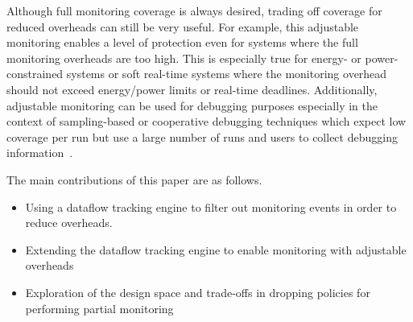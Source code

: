 Although full monitoring coverage is always desired, trading off coverage for
reduced overheads can still be very useful. For example, this adjustable
monitoring enables a level of protection even for systems where the full
monitoring overheads are too high. This is especially true for energy- or
power-constrained systems or soft real-time systems where the monitoring
overhead should not exceed energy/power limits or real-time deadlines.
Additionally, adjustable monitoring can be used for debugging purposes
especially in the context of sampling-based or cooperative debugging techniques
which expect low coverage per run but use a large number of runs and users to
collect debugging information~\cite{liblit-pldi05, chilimbi-asplos04,
greathouse-cgo11}. 

The main contributions of this paper are as follows.
\begin{itemize}
  \item Using a dataflow tracking engine to filter out monitoring events in order to reduce overheads.
  \item Extending the dataflow tracking engine to enable monitoring with adjustable overheads
  \item Exploration of the design space and trade-offs in dropping policies for performing partial monitoring
\end{itemize}


